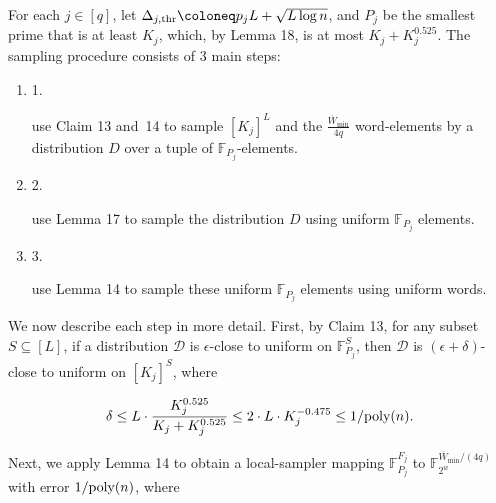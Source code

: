 \documentclass[10pt,a4paper]{article}
\begin{document}



For each $j\in[q]$, let $\Delta_{j,{\rm thr}}\coloneq p_{j}L+\sqrt{L\log n}$, and $P_{j}$ be the smallest prime that is at least $K_{j}$, which, by Lemma 18, is at most $K_{j}+K_{j}^{0.525}$.
The sampling procedure consists of 3 main steps:\par


\begin{enumerate}


\item[] 
1. 


use Claim 13 and 14 to sample $[K_{j}]^{L}$ and the $\frac{\overline{W}_{\min}}{4q}$ word-elements by a distribution $D$ over a tuple of $\mathbb{F}_{P_{j}}$-elements.\par





\item[] 
2. 


use Lemma 17 to sample the distribution $D$ using uniform $\mathbb{F}_{P_{j}}$ elements.\par





\item[] 
3. 


use Lemma 14 to sample these uniform $\mathbb{F}_{P_{j}}$ elements using uniform words.\par





\end{enumerate}




We now describe each step in more detail.
First, by Claim 13, for any subset $S\subseteq[L]$, if a distribution $\mathcal{D}$ is $\epsilon$-close to uniform on $\mathbb{F}_{P_{j}}^{S}$, then $\mathcal{D}$ is $(\epsilon+\delta)$-close to uniform on $[K_{j}]^{S}$, where\par


\[\begin{gathered}
\displaystyle\delta\leq L\cdot\frac{K_{j}^{0.525}}{K_{j}+K_{j}^{0.525}}\leq 2\cdot L\cdot K_{j}^{-0.475}\leq 1/\textnormal{poly}(n).
\end{gathered}\]


Next, we apply Lemma 14 to obtain a local-sampler mapping $\mathbb{F}_{P_{j}}^{F_{j}}$ to $\mathbb{F}_{2^{w}}^{\overline{W}_{\min}/(4q)}$ with error $1/\textnormal{poly}(n)$, where\par
\end{document}
